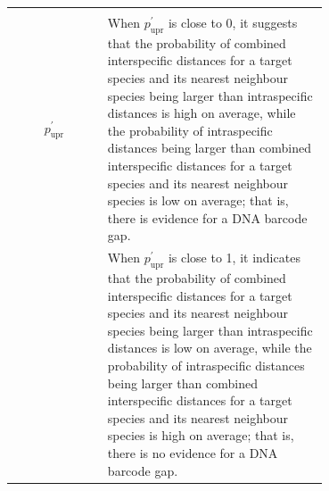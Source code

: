 \documentclass[12pt]{article}
\begin{document}
\begin{table}[htbp]
\begin{tabular}{cp{0.7\linewidth}}
        & \\[-2mm]
    $p^{'}_{\text{upr}}$ & When $p^{'}_{\text{upr}}$ is close to 0, it suggests that the probability of combined interspecific distances for a target species and its nearest neighbour species being larger than intraspecific distances is high on average, while the probability of intraspecific distances being larger than combined interspecific distances for a target species and its nearest neighbour species is low on average; that is, there is evidence for a DNA barcode gap.\\
    & When $p^{'}_{\text{upr}}$ is close to 1, it indicates that the probability of combined interspecific distances for a target species and its nearest neighbour species being larger than intraspecific distances is low on average, while the probability of intraspecific distances being larger than combined interspecific distances for a target species and its nearest neighbour species is high on average; that is, there is no evidence for a DNA barcode gap.\\
    \hline
    \end{tabular}
\end{table}
\end{document}
